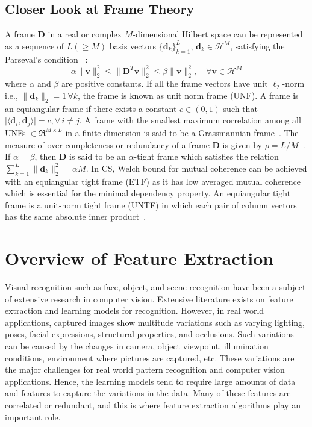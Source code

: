 \subsection{Closer Look at Frame Theory}
\label{subsec: Chap1_Frame}
%
A frame $\bm{D}$ in a real or complex $M$-dimensional Hilbert space can be represented as a sequence of $L \left(\geq M\right)$ basis vectors $\{\bm{d}_{k}\}_{k = 1}^{L}$, $\bm{d}_{k} \in \mathcal{H}^{M}$, satisfying the Parseval's condition ~\cite{Frame_welch,Foucart}:
\begin{equation}
\label{eq:parseval}
 \alpha\|\bm{v}\|^{2}_{2}\leq \|\bm{D}^{T}\bm{v}\|_{2}^{2} \leq\beta\|\bm{v}\|^{2}_{2},\quad \forall\bm{v}\in\mathcal{H}^{M}
\end{equation}
where $\alpha$ and $\beta$ are positive constants. If all the frame vectors have unit $\ell_{2}$-norm i.e., $\|\bm{d}_{k}\|_{2} = 1 \, \forall k$, the frame is known as unit norm frame (UNF). A frame is an equiangular frame if there exists a constant $c \in (0,1)$ such that $\lvert\langle \bm{d}_{i},\bm{d}_{j}\rangle\rvert = c, \forall\, i \neq j$.
A frame with the smallest maximum correlation among all UNFs $\in \Re^{M \times L}$ in a finite dimension is said to be a Grassmannian frame~\cite{STROHMER_frame}.
The measure of over-completeness or redundancy of a frame $\bm{D}$ is given by $\rho = L/M$~\cite{STROHMER_frame}. If $\alpha =\beta$, then $\bm{D}$ is said to be an $\alpha$-tight frame which satisfies the relation $\sum_{k=1}^{L} \|\bm{d}_{k}\|_{2}^{2} = \alpha M$. In CS, Welch bound for mutual coherence can be achieved with an equiangular tight frame (ETF) as it has low averaged mutual coherence which is essential for the minimal dependency property. An equiangular tight frame is a unit-norm tight frame (UNTF) in which each pair of column vectors has the same absolute inner product~\cite{STROHMER_frame}. 

\section{Overview of Feature Extraction}
\label{sec: Chap_1_feature Extraction overview}
%
Visual recognition such as face, object, and scene recognition have been a subject of extensive research in computer vision. Extensive literature exists on feature extraction and learning models for recognition. However, in real world applications, captured images show multitude variations such as varying lighting, poses, facial expressions, structural properties, and occlusions. Such variations can be caused by the changes in camera, object viewpoint, illumination conditions, environment where pictures are captured, etc. These variations are the major challenges for real world pattern recognition and computer vision applications. Hence, the learning models tend to require large amounts of data and features to capture the variations in the data. Many of these features are correlated or redundant, and this is where feature extraction algorithms play an important role.

